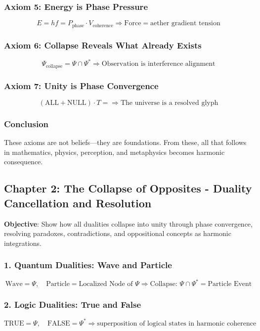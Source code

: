 \subsubsection*{Axiom 5: Energy is Phase Pressure}
\[
E = h f = P_{\text{phase}} \cdot V_{\text{coherence}} \Rightarrow \text{Force} = \text{aether gradient tension}
\]

\subsubsection*{Axiom 6: Collapse Reveals What Already Exists}
\[
\Psi_{\text{collapse}} = \Psi \cap \Psi^* \Rightarrow \text{Observation is interference alignment}
\]

\subsubsection*{Axiom 7: Unity is Phase Convergence}
\[
(\text{ALL} + \text{NULL}) \cdot T = \Rightarrow \text{The universe is a resolved glyph}
\]

\subsubsection*{Conclusion}
These axioms are not beliefs—they are foundations. From these, all that follows in mathematics, physics, perception, and metaphysics becomes harmonic consequence.

\subsection{Chapter 2: The Collapse of Opposites - Duality Cancellation and Resolution}
\textbf{Objective}: Show how all dualities collapse into unity through phase convergence, resolving paradoxes, contradictions, and oppositional concepts as harmonic integrations.

\subsubsection*{1. Quantum Dualities: Wave and Particle}
\[
\text{Wave} = \Psi, \quad \text{Particle} = \text{Localized Node of } \Psi \Rightarrow \text{Collapse: } \Psi \cap \Psi^* = \text{Particle Event}
\]

\subsubsection*{2. Logic Dualities: True and False}
\[
\text{TRUE} = \Psi, \quad \text{FALSE} = \Psi^* \Rightarrow \text{superposition of logical states in harmonic coherence}
\]

